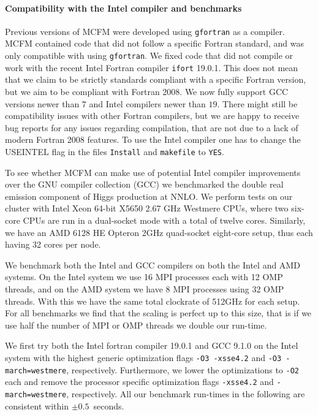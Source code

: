 \paragraph{Compatibility with the Intel compiler and benchmarks}

Previous versions of MCFM were developed using \texttt{gfortran} as a compiler. MCFM contained code that did not 
follow 
a specific Fortran standard, and was only compatible with using \texttt{gfortran}. We fixed code that did not compile 
or work with the recent Intel Fortran compiler \texttt{ifort} 19.0.1. This does not mean that we claim to be strictly 
standards 
compliant with a specific Fortran version, but we aim to be compliant with Fortran 2008. We now fully support GCC 
versions newer than $7$ and Intel compilers newer than $19$. There might still be compatibility issues with other 
Fortran compilers, but we are happy to receive bug reports for any issues regarding compilation, that are not due to a 
lack of modern Fortran 2008 features. To use the Intel compiler one has to change the USEINTEL flag in the files 
\texttt{Install} and \texttt{makefile}
to \texttt{YES}.

To see whether MCFM can make use of potential Intel compiler improvements over the GNU compiler 
collection (GCC) we benchmarked 
the double
real emission component of Higgs production at NNLO. We perform tests on our cluster with
Intel Xeon 64-bit X5650 2.67 GHz Westmere CPUs, where two six-core CPUs are run in a dual-socket mode with a total
of twelve cores. Similarly, we have an AMD 6128 HE Opteron 2GHz quad-socket eight-core setup, thus each having
32 cores per node.

We benchmark both the Intel and GCC compilers on both the Intel and AMD systems. On the Intel system we use 16 MPI 
processes each with 12 OMP threads, 
and on the AMD system we have 8 MPI processes using 32 OMP threads. With this we have the same total
clockrate of {512}{GHz} for each setup. For all benchmarks we find that the scaling is perfect up to this size, that 
is if we use half the number of MPI or OMP threads we double our run-time.

We first try both the Intel fortran compiler 19.0.1 and GCC 9.1.0 on the Intel system with the highest generic
optimization flags \texttt{-O3 -xsse4.2} and \texttt{-O3 -march=westmere}, respectively. Furthermore,
we lower the optimizations to \texttt{-O2} each and remove the processor specific optimization flags
\texttt{-xsse4.2} and \texttt{-march=westmere}, respectively. All our benchmark run-times in the following are 
consistent within $\pm 0.5$~seconds.

